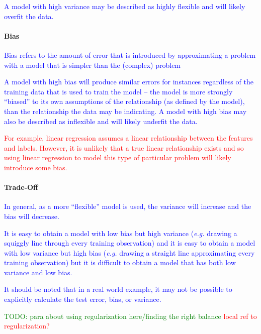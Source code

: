 \textcolor{blue}{A model with high variance may be described as highly flexible and will likely overfit the data.}


\paragraph{Bias}
\textcolor{blue}{Bias refers to the amount of error that is introduced by approximating a problem with a model that is simpler than the (complex) problem}

\textcolor{blue}{A model with high bias will produce similar errors for instances regardless of the training data that is used to train the model -- the model is more strongly ``biased'' to its own assumptions of the relationship (as defined by the model), than the relationship the data may be indicating. A model with high bias may also be described as inflexible and will likely underfit the data.}


\textcolor{red}{For example, linear regression assumes a linear relationship between the features and labels. However, it is unlikely that a true linear relationship exists and so using linear regression to model this type of particular problem will likely introduce some bias.}

\paragraph{Trade-Off}


\textcolor{blue}{In general, as a more ``flexible'' model is used, the variance will increase and the bias will decrease.}


\textcolor{blue}{It is easy to obtain a model with low bias but high variance (\emph{e.g.} drawing a squiggly line through every training observation) and it is easy to obtain a model with low variance but high bias (\emph{e.g.} drawing a straight line approximating every training observation) but it is difficult to obtain a model that has both low variance and low bias.}

\textcolor{blue}{It should be noted that in a real world example, it may not be possible to explicitly calculate the test error, bias, or variance.}

\textcolor{green}{TODO: para about using regularization here/finding the right balance \textcolor{red}{local ref to regularization?}}
